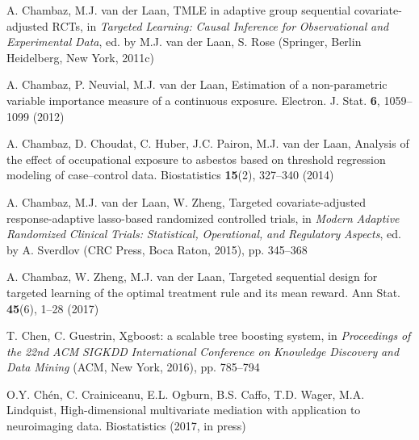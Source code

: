 \begin{list}{}{\setlength{\leftmargin}{2.1em}\setlength{\labelwidth}{0pt}
  \setlength{\labelsep}{0pt}\setlength{\itemindent}{-2.1em}
  \setlength{\parsep}{0pt}\setlength{\itemsep}{2pt}\setlength{\topsep}{0pt}}
\item\label{refentry:REF062}A. Chambaz, M.J. van der Laan, TMLE in adaptive group sequential covariate-adjusted RCTs, in \textit{Targeted} \textit{Learning:} \textit{Causal} \textit{Inference} \textit{for} \textit{Observational} \textit{and} \textit{Experimental} \textit{Data}, ed. by M.J. van der Laan, S. Rose (Springer, Berlin Heidelberg, New York, 2011c)\label{refend:REF062}
\item\label{refentry:REF063}A. Chambaz, P. Neuvial, M.J. van der Laan, Estimation of a non-parametric variable importance measure of a continuous exposure. Electron. J. Stat. \textbf{6}, 1059--1099 (2012)\label{refend:REF063}
\item\label{refentry:REF064}A. Chambaz, D. Choudat, C. Huber, J.C. Pairon, M.J. van der Laan, Analysis of the effect of occupational exposure to asbestos based on threshold regression modeling of case--control data. Biostatistics \textbf{15}(2), 327--340 (2014)\label{refend:REF064}
\item\label{refentry:REF065}A. Chambaz, M.J. van der Laan, W. Zheng, Targeted covariate-adjusted response-adaptive lasso-based randomized controlled trials, in \textit{Modern} \textit{Adaptive} \textit{Randomized} \textit{Clinical} \textit{Trials:} \textit{Statistical,} \textit{Operational,} \textit{and} \textit{Regulatory} \textit{Aspects}, ed. by A. Sverdlov (CRC Press, Boca Raton, 2015), pp. 345--368\label{refend:REF065}
\item\label{refentry:REF066}A. Chambaz, W. Zheng, M.J. van der Laan, Targeted sequential design for targeted learning of the optimal treatment rule and its mean reward. Ann Stat. \textbf{45}(6), 1--28 (2017)\label{refend:REF066}
\item\label{refentry:REF067}T. Chen, C. Guestrin, Xgboost: a scalable tree boosting system, in \textit{Proceedings} \textit{of} \textit{the} \textit{22nd} \textit{ACM} \textit{SIGKDD} \textit{International} \textit{Conference} \textit{on} \textit{Knowledge} \textit{Discovery} \textit{and} \textit{Data} \textit{Mining} (ACM, New York, 2016), pp. 785--794\label{refend:REF067}
\item\label{refentry:REF068}O.Y. Chén, C. Crainiceanu, E.L. Ogburn, B.S. Caffo, T.D. Wager, M.A. Lindquist, High-dimensional multivariate mediation with application to neuroimaging data. Biostatistics (2017, in press)\label{refend:REF068}

\end{list}
